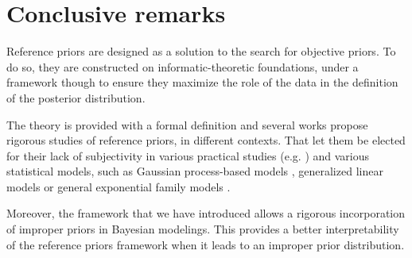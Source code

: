 \section{Conclusive remarks}\label{sec:intro-ref:conclusion}



Reference priors are designed 
as a solution to the search for objective priors.
To do so, they are constructed on informatic-theoretic foundations, under a framework though to ensure they maximize the role of the data in the definition of the posterior distribution.


The theory is provided with a formal definition and
several works propose rigorous studies of reference priors, in different contexts.
That let them be elected for their lack of subjectivity in various practical studies (e.g. \cite{chen_properties_2008,gu_parallel_2016,dandrea_objective_2021})
and various statistical models, such as Gaussian process-based models \citep{paulo_default_2005,gu_parallel_2016}, generalized linear models \citep{natarajan_reference_2000} or general exponential family models \citep{clarke_reference_2010}.

Moreover, the framework that we have introduced allows a rigorous incorporation of improper priors in Bayesian modelings.
This provides a better interpretability of the reference priors framework when it leads to an improper prior distribution. 









